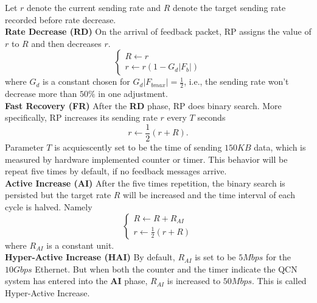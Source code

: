\documentclass{sig-alternate-10pt}
\begin{document}
Let $r$ denote the current sending rate and $R$ denote the target sending rate recorded before rate decrease.
\\
\textbf{Rate Decrease (RD)} On the arrival of feedback packet, RP assigns the value of $r$ to $R$ and then decreases $r$. 
\begin{equation}
\left \{ \begin{array}{l}
R\leftarrow r \\
r\leftarrow r(1-G_d |F_b| )
\end{array}
\right.
\label{decrease}
\end{equation}
where $G_d$ is a constant chosen for $G_d |F_{bmax}|=\frac{1}{2}$, i.e., the sending rate won't decrease more than $50\%$ in one adjustment.
\\
\textbf{Fast Recovery (FR)} After the \textbf{RD} phase, RP does binary search. More specifically, RP increases its sending rate $r$ every $T$ seconds 
\begin{equation} 
r\leftarrow \frac{1}{2}(r+R).
\label{fastrecovery}
\end{equation}
Parameter $T$ is acquiescently set to be the time of sending $150KB$ data, which is measured by hardware implemented counter or timer. This behavior will be repeat five times by default, if no feedback messages arrive. 
\\
\textbf{Active Increase (AI)}
After the five times repetition, the binary search is persisted but the target rate $R$ will be increased and the time interval of each cycle is halved. Namely
\begin{equation}
\label{xy} \left \{ \begin{array}{l}
R\leftarrow R+R_{AI} \\
r\leftarrow \frac{1}{2}(r+R)
\end{array}
\right.
\end{equation}
where $R_{AI}$ is a constant unit.
\\
\textbf{Hyper-Active Increase (HAI)}
By default, $R_{AI}$ is set to be $5Mbps$ for the $10Gbps$ Ethernet. But when both the counter and the timer indicate the QCN system has entered into the \textbf{AI} phase, $R_{AI}$ is increased to $50Mbps$. This is called Hyper-Active Increase.
\iffalse
\\
\textbf{Target Rate Reduction}
If $R$ is large than $r$ by 10 times, $R$ is decreased by a factor of 8. 
\\
\textbf{Extra Fast Recovery}
When RP receives consecutive feedback packets in one cycle, it just do RD once.
\fi
\end{document}
